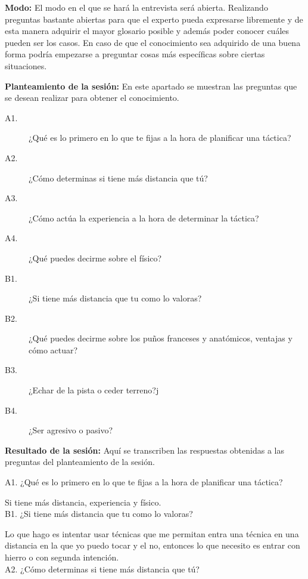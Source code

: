 \textbf{Modo:} El modo en el que se hará la entrevista será abierta. Realizando preguntas bastante abiertas
para que el experto pueda expresarse libremente y de esta manera adquirir el mayor glosario
posible y además poder conocer cuáles pueden ser los casos. En caso de que el conocimiento
sea adquirido de una buena forma podría empezarse a preguntar cosas más específicas sobre
ciertas situaciones.

\textbf{Planteamiento de la sesión:} En este apartado se muestran las preguntas que se desean
 realizar para obtener el conocimiento.

\begin{description}
  \item [A1.] ¿Qué es lo primero en lo que te fijas a la hora de planificar una táctica?
  \item [A2.] ¿Cómo determinas si tiene más distancia que tú?
  \item [A3.] ¿Cómo actúa la experiencia a la hora de determinar la táctica?
  \item [A4.] ¿Qué puedes decirme sobre el físico?
\end{description}

\begin{description}
  \item [B1.] ¿Si tiene más distancia que tu como lo valoras?
  \item [B2.] ¿Qué puedes decirme sobre los puños franceses y anatómicos, ventajas y cómo actuar?
  \item [B3.] ¿Echar de la pista o ceder terreno?j
  \item [B4.] ¿Ser agresivo o pasivo?
\end{description}


\textbf{Resultado de la sesión:} Aquí se transcriben las respuestas obtenidas a las preguntas
 del planteamiento de la sesión.

A1. ¿Qué es lo primero en lo que te fijas a la hora de planificar una táctica?

Si tiene más distancia, experiencia y físico.
\\

B1. ¿Si tiene más distancia que tu como lo valoras?

Lo que hago es intentar usar técnicas que me permitan entra una técnica en una distancia en la
que yo puedo tocar y el no, entonces lo que necesito es entrar con hierro o con segunda
intención.
\\

A2. ¿Cómo determinas si tiene más distancia que tú?

